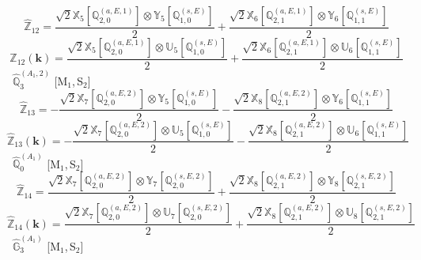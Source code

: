 \documentclass[fleqn,10pt,landscape]{article}
\begin{document}
\begin{itemize}
\begin{dmath*}
\hat{\mathbb{Z}}_{12}=\frac{\sqrt{2} \mathbb{X}_{5}[\mathbb{Q}_{2,0}^{(a,E,1)}] \otimes\mathbb{Y}_{5}[\mathbb{Q}_{1,0}^{(s,E)}]}{2} + \frac{\sqrt{2} \mathbb{X}_{6}[\mathbb{Q}_{2,1}^{(a,E,1)}] \otimes\mathbb{Y}_{6}[\mathbb{Q}_{1,1}^{(s,E)}]}{2}
\end{dmath*}
\begin{dmath*}
\hat{\mathbb{Z}}_{12}(\bm{k})=\frac{\sqrt{2} \mathbb{X}_{5}[\mathbb{Q}_{2,0}^{(a,E,1)}] \otimes\mathbb{U}_{5}[\mathbb{Q}_{1,0}^{(s,E)}]}{2} + \frac{\sqrt{2} \mathbb{X}_{6}[\mathbb{Q}_{2,1}^{(a,E,1)}] \otimes\mathbb{U}_{6}[\mathbb{Q}_{1,1}^{(s,E)}]}{2}
\end{dmath*}
\vspace{4mm}
\noindent {} $\,\,\,\hat{\mathbb{Q}}_{3}^{(A_{1},2)}$ [M$_{1}$,\,S$_{2}$]
\begin{dmath*}
\hat{\mathbb{Z}}_{13}=- \frac{\sqrt{2} \mathbb{X}_{7}[\mathbb{Q}_{2,0}^{(a,E,2)}] \otimes\mathbb{Y}_{5}[\mathbb{Q}_{1,0}^{(s,E)}]}{2} - \frac{\sqrt{2} \mathbb{X}_{8}[\mathbb{Q}_{2,1}^{(a,E,2)}] \otimes\mathbb{Y}_{6}[\mathbb{Q}_{1,1}^{(s,E)}]}{2}
\end{dmath*}
\begin{dmath*}
\hat{\mathbb{Z}}_{13}(\bm{k})=- \frac{\sqrt{2} \mathbb{X}_{7}[\mathbb{Q}_{2,0}^{(a,E,2)}] \otimes\mathbb{U}_{5}[\mathbb{Q}_{1,0}^{(s,E)}]}{2} - \frac{\sqrt{2} \mathbb{X}_{8}[\mathbb{Q}_{2,1}^{(a,E,2)}] \otimes\mathbb{U}_{6}[\mathbb{Q}_{1,1}^{(s,E)}]}{2}
\end{dmath*}
\vspace{4mm}
\noindent {} $\,\,\,\hat{\mathbb{Q}}_{0}^{(A_{1})}$ [M$_{1}$,\,S$_{2}$]
\begin{dmath*}
\hat{\mathbb{Z}}_{14}=\frac{\sqrt{2} \mathbb{X}_{7}[\mathbb{Q}_{2,0}^{(a,E,2)}] \otimes\mathbb{Y}_{7}[\mathbb{Q}_{2,0}^{(s,E,2)}]}{2} + \frac{\sqrt{2} \mathbb{X}_{8}[\mathbb{Q}_{2,1}^{(a,E,2)}] \otimes\mathbb{Y}_{8}[\mathbb{Q}_{2,1}^{(s,E,2)}]}{2}
\end{dmath*}
\begin{dmath*}
\hat{\mathbb{Z}}_{14}(\bm{k})=\frac{\sqrt{2} \mathbb{X}_{7}[\mathbb{Q}_{2,0}^{(a,E,2)}] \otimes\mathbb{U}_{7}[\mathbb{Q}_{2,0}^{(s,E,2)}]}{2} + \frac{\sqrt{2} \mathbb{X}_{8}[\mathbb{Q}_{2,1}^{(a,E,2)}] \otimes\mathbb{U}_{8}[\mathbb{Q}_{2,1}^{(s,E,2)}]}{2}
\end{dmath*}
\vspace{4mm}
\noindent {} $\,\,\,\hat{\mathbb{G}}_{3}^{(A_{1})}$ [M$_{1}$,\,S$_{2}$]
\begin{dmath*}

\end{dmath*}
\end{itemize}
\end{document}
